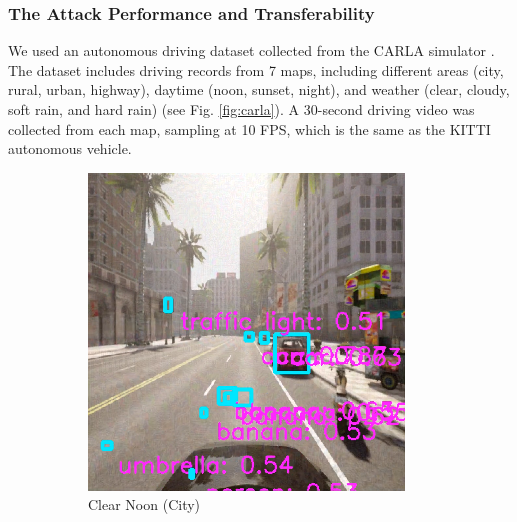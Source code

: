\clearpage

\subsubsection{The Attack Performance and Transferability}

We used an autonomous driving dataset collected from the CARLA simulator \citep{deschaud2021kitticarla}. The dataset includes driving records from 7 maps, including different areas (city, rural, urban, highway), daytime (noon, sunset, night), and weather (clear, cloudy, soft rain, and hard rain) (see Fig. \ref{fig:carla}). A 30-second driving video was collected from each map, sampling at 10 FPS, which is the same as the KITTI autonomous vehicle. 

\begin{figure}[H]
    \centering
    \begin{subfigure}[b]{0.48\textwidth}
        \centering
        \includegraphics[width=\linewidth]{figures/chapter_detection/hardware/clear_noon_city.png}
        \caption{Clear Noon (City)}
        \label{fig:clear_noon} 
    \end{subfigure}
    \begin{subfigure}[b]{0.48\textwidth}
        \centering

\end{subfigure}
\end{figure}
